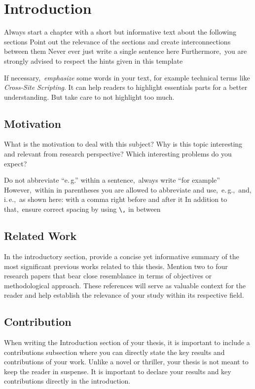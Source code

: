 \chapter{Introduction} \label{chap:intro}
Always start a chapter with a short but informative text about the following sections Point out the relevance of the sections and create interconnections between them Never ever just write a single sentence here Furthermore,\ you are strongly advised to respect the hints given in this template

If necessary,\ \emph{emphasize} some words in your text, for example technical terms like \emph{Cross-Site Scripting}.
It can help readers to highlight essentials parts for a better understanding.
But take care to not highlight too much.

\section{Motivation}
What is the motivation to deal with this subject?
Why is this topic interesting and relevant from research perspective?
Which interesting problems do you expect?

Do not abbreviate \enquote{e.\,g.\/} within a sentence,\ always write \enquote{for example} However,\ within in parentheses you are allowed to abbreviate and use,\ e.\,g.,\ and, i.\,e.,\ as shown here: with a comma right before and after it In addition to that,\ ensure correct spacing by using \texttt{\textbackslash,} in between

\section{Related Work}

In the introductory section, provide a concise yet informative summary of the most significant previous works related to this thesis. Mention two to four research papers that bear close resemblance in terms of objectives or methodological approach. These references will serve as valuable context for the reader and help establish the relevance of your study within its respective field.

\section{Contribution}

When writing the Introduction section of your thesis, it is important to include a contributions subsection where you can directly state the key results and contributions of your work. Unlike a novel or thriller, your thesis is not meant to keep the reader in suspense. It is important to declare your results and key contributions directly in the introduction.

